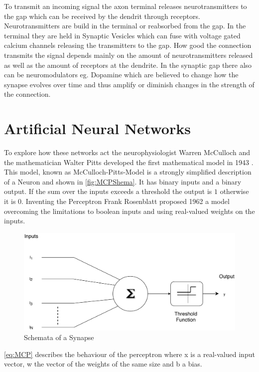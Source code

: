 To transmit an incoming signal the axon terminal releases neurotransmitters to the gap which can be received by the dendrit through receptors. Neurotransmitters are build in the terminal or reabsorbed from the gap. In the terminal they are held in Synaptic Vesicles which can fuse with voltage gated calcium channels releasing the transmitters to the gap\cite{Catterall411}. How good the connection transmits the signal depends mainly on the amount of neurotransmitters released as well as the amount of receptors at the dendrite. 
In the synaptic gap there also can be neuromodulators eg. Dopamine which are believed to change how the synapse evolves over time and thus amplify or diminish changes in the strength of the connection.

\section{Artificial Neural Networks}
To explore how these networks act the neurophysiologist Warren McCulloch and the mathematician Walter Pitts developed the first mathematical model in 1943 \cite{mcculloch1943logical}. This model, known as McCulloch-Pitts-Model is a strongly simplified description of a Neuron and shown in \autoref{fig:MCPShema}. It has binary inputs and a binary output. If the sum over the  inputs exceeds a threshold the output is $1$ otherwise it is $0$. Inventing the Perceptron Frank Rosenblatt proposed 1962 a model overcoming the limitations to boolean inputs and using real-valued weights on the inputs.
\begin{figure}[htpb]
  \centering
  \includegraphics[scale=0.65]{figures/McPSchema.pdf}
  \caption[Schemata of McCulloch-Pitts-Model]{Schemata of a Synapse \cite{wikiSyn}}
  \label{fig:MCPShema}
\end{figure}
\newline
\autoref{eq:MCP} describes the behaviour of the perceptron where x is a real-valued input vector, w the vector of the weights of the same size and b a bias. 
\newline

